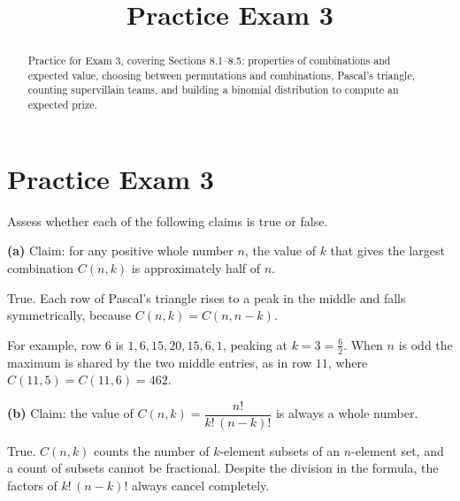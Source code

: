 \documentclass[12pt]{ximera}
\title{Practice Exam 3}
\begin{document}
\begin{abstract}
Practice for Exam 3, covering Sections 8.1--8.5: properties of combinations and
expected value, choosing between permutations and combinations, Pascal's triangle,
counting supervillain teams, and building a binomial distribution to compute an
expected prize.
\end{abstract}
\maketitle

\section*{Practice Exam 3}

\begin{problem}
Assess whether each of the following claims is true or false.

\begin{prompt}
\textbf{(a)} Claim: for any positive whole number $n$, the value of $k$ that gives
the largest combination $C(n,k)$ is approximately half of $n$.

\begin{multipleChoice}
\end{multipleChoice}

\begin{feedback}
True. Each row of Pascal's triangle rises to a peak in the middle and falls
symmetrically, because $C(n,k)=C(n,n-k)$.

For example, row $6$ is $1, 6, 15, 20, 15, 6, 1$, peaking at $k=3=\frac62$. When $n$
is odd the maximum is shared by the two middle entries, as in row $11$, where
$C(11,5)=C(11,6)=462$.
\end{feedback}
\end{prompt}

\begin{prompt}
\textbf{(b)} Claim: the value of $C(n,k)=\dfrac{n!}{k!\,(n-k)!}$ is always a whole
number.

\begin{multipleChoice}
\end{multipleChoice}

\begin{feedback}
True. $C(n,k)$ counts the number of $k$-element subsets of an $n$-element set, and a
count of subsets cannot be fractional. Despite the division in the formula, the
factors of $k!\,(n-k)!$ always cancel completely.
\end{feedback}
\end{prompt}


\end{problem}
\end{document}
